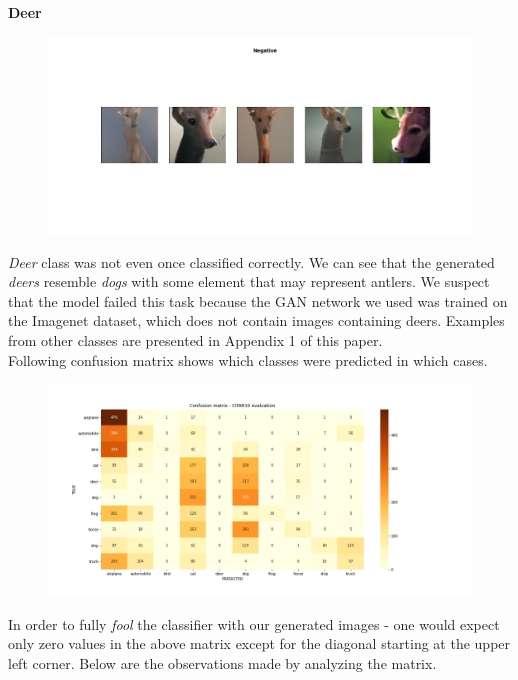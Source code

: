 \documentclass[12pt,a4paper,openany]{book}
\begin{document}
\newline
\noindent \textbf{Deer} \\
\begin{figure}[ht!]
    \centering
    \includegraphics[scale=0.40]{figs/cifar10_examples/deer.png}
\end{figure}
\newline
\noindent \textit{Deer} class was not even once classified correctly. We can see that the generated \textit{deers} resemble \textit{dogs} with some element that may represent antlers. We suspect that the model failed this task because the GAN network we used was trained on the Imagenet dataset, which does not contain images containing deers.
Examples from other classes are presented in Appendix 1 of this paper. \\
\noindent Following confusion matrix shows which classes were predicted in which cases.
\begin{figure}[ht!]
    \includegraphics[scale=0.45]{figs/cifar10_examples/confusion_matrix.png}
\end{figure}
\newline
In order to fully \textit{fool} the classifier with our generated images - one would expect only zero values in the above matrix except for the diagonal starting at the upper left corner. Below are the observations made by analyzing the matrix.
\end{document}
